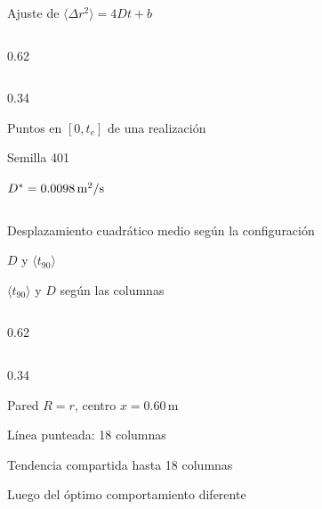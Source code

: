 \documentclass[aspectratio=169,10pt]{beamer}
\begin{document}
\begin{frame}{Ajuste de $\langle \Delta r^{2}\rangle = 4Dt + b$}
  \begin{cols}
    \begin{column}{0.62\textwidth}
    \end{column}
    \begin{column}{0.34\textwidth}
      \begin{parametros}
        \item Puntos en $[0, t_e]$ de una realización
        \item Semilla 401
      \end{parametros}
      \begin{resultado}
        \item $D^{*} = 0.0098\,\mathrm{m}^{2}/\mathrm{s}$
      \end{resultado}
    \end{column}
  \end{cols}
\end{frame}

\begin{frame}{Desplazamiento cuadrático medio según la configuración}
    \centering   
\end{frame}

\begin{frame}{$D$ y $\langle t_{90}\rangle$}
  \centering\small
  \renewcommand{\arraystretch}{1.35}
  
  \par\vspace{8pt}
\end{frame}


\begin{frame}{$\langle t_{90}\rangle$ y $D$ según las columnas}
  \begin{cols}
    \begin{column}{0.62\textwidth}
    \end{column}
    \begin{column}{0.34\textwidth}
      \begin{parametros}
        \item Pared $R = r$, centro $x = 0.60\,\mathrm{m}$
        \item Línea punteada: 18 columnas
      \end{parametros}
      \begin{resultado}
        \item Tendencia compartida hasta 18 columnas
        \item Luego del óptimo comportamiento diferente
      \end{resultado}
    \end{column}
  \end{cols}
\end{frame}
\end{document}
